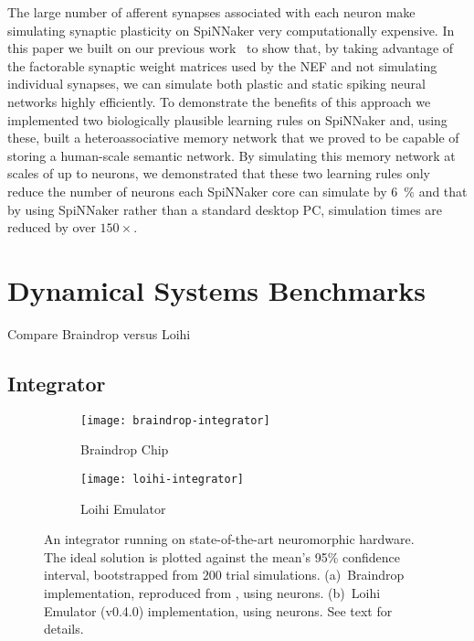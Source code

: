 The large number of afferent synapses associated with each neuron make simulating synaptic plasticity on SpiNNaker very computationally expensive.
In this paper we built on our previous work~\citep{mundy2015} to show that, by taking advantage of the factorable synaptic weight matrices used by the NEF and not simulating individual synapses, we can simulate both plastic and static spiking neural networks highly efficiently.
To demonstrate the benefits of this approach we implemented two biologically plausible learning rules on SpiNNaker and, using these, built a heteroassociative memory network that we proved to be capable of storing a human-scale semantic network.
By simulating this memory network at scales of up to  neurons, we demonstrated that these two learning rules only reduce the number of neurons each SpiNNaker core can simulate by \SI{6}{\percent} and that by using SpiNNaker rather than a standard desktop PC, simulation times are reduced by over $150\times$.

\section{Dynamical Systems Benchmarks}

Compare Braindrop versus Loihi

\subsection{Integrator}

\begin{figure}
  \centering
  \begin{subfigure}{.5\textwidth}
    \centering
    \texttt{[image: braindrop-integrator]}
    \caption{Braindrop Chip}
    \label{fig:dn-braindrop}
  \end{subfigure}%
  \begin{subfigure}{.5\textwidth}
    \centering
    \texttt{[image: loihi-integrator]}
    \caption{Loihi Emulator}
    \label{fig:dn-loihi}
  \end{subfigure}
  \caption{ \label{fig:integrator-neuromorphic}
    An integrator running on state-of-the-art neuromorphic hardware.
    The ideal solution is plotted against the mean's 95\% confidence interval, bootstrapped from $200$ trial simulations.
    (a)~Braindrop implementation, reproduced from \citet[][Figure~15]{braindrop2019}, using  neurons. 
    (b)~Loihi Emulator (v0.4.0) implementation, using  neurons.
    See text for details.
  }
\end{figure}

